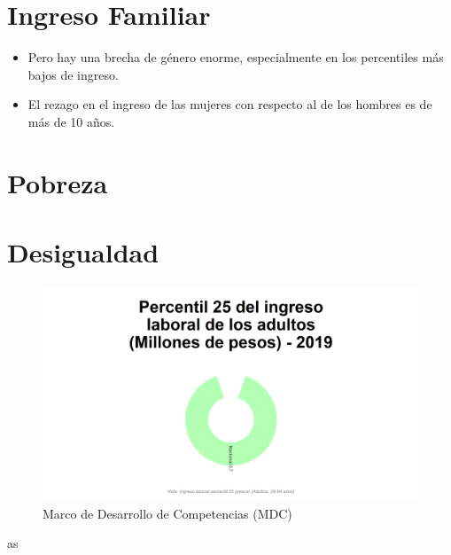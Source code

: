 


\section{Ingreso Familiar}

            \begin{itemize}
                    \item Pero hay una brecha de género enorme, especialmente en los percentiles más bajos de ingreso.
                    \item El rezago en el ingreso de las mujeres con respecto al de los hombres es de más de 10 años.
                \end{itemize}

\section{Pobreza}

\section{Desigualdad}

    \begin{figure}[H]
        \caption{Marco de Desarrollo de Competencias (MDC) \label{map_result_2} }
        \begin{center}
        \includegraphics[width=\textwidth,keepaspectratio]{img/var_10_static.png}
        \end{center}
    \end{figure}
    
    as